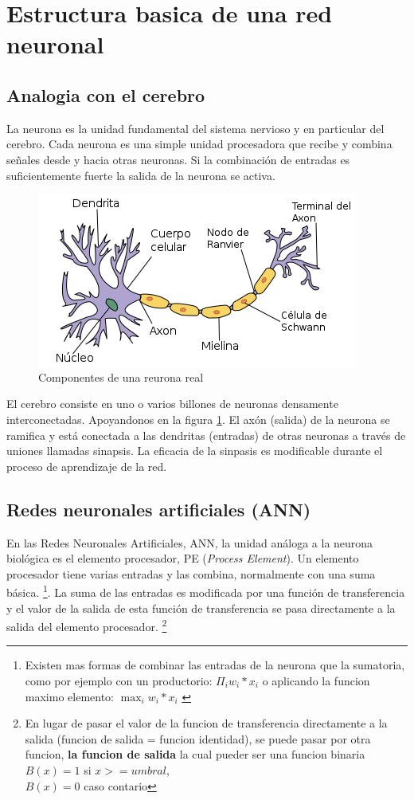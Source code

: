 \documentclass[runningheads]{llncs} %
\begin{document}
\section{Estructura basica de una red neuronal}
\subsection{Analogia con el cerebro}
La neurona es la unidad fundamental del sistema nervioso y en particular 
del cerebro. Cada neurona es una simple unidad procesadora que recibe y combina 
señales desde y hacia otras neuronas. 
Si la combinación de entradas es suficientemente fuerte la salida de la neurona
se activa. \cite{libro-def}

\begin{figure}
    \centering
    \includegraphics[scale=0.5]{neurona_real.png}
    \caption{Componentes de una reurona real \cite{img-neurona_real}}
    \label{fig:neurona_real}
\end{figure}

El cerebro consiste en uno o varios billones de neuronas densamente 
interconectadas. Apoyandonos en la figura \ref{fig:neurona_real}.
El axón (salida) de la neurona se ramifica y está conectada a las dendritas (entradas) 
de otras neuronas a través de uniones llamadas sinapsis.
La eficacia de la sinpasis es modificable durante el proceso de 
aprendizaje de la red. \cite{libro-def}

\subsection{Redes neuronales artificiales (ANN)}
En las Redes Neuronales Artificiales, ANN, la unidad análoga a la neurona biológica es
el elemento procesador, PE (\textit{Process Element}). Un elemento procesador tiene varias
entradas y las combina, normalmente con una suma básica. 
\footnote[1]{Existen mas formas de combinar las entradas de la neurona 
que la sumatoria, como por ejemplo con un productorio: \(\Pi_{i}{w_{i}*x_{i}}\)
o aplicando la funcion maximo elemento: \(\max_{i}{w_{i}*x_{i}}\) \cite{tesis-matich}}.
La suma de las entradas es
modificada por una función de transferencia y el valor de la salida de esta función de
transferencia se pasa directamente a la salida del elemento procesador.
\footnote[2]{En lugar de pasar el valor de la funcion de transferencia
directamente a la salida (funcion de salida = funcion identidad), 
se puede pasar por otra funcion, \textbf{la funcion de salida} 
la cual pueder ser una funcion binaria \cite{tesis-matich} \\
\(B(x)=1\) si \(x>=umbral\), \\
\(B(x)=0\) caso contario}
\end{document}
